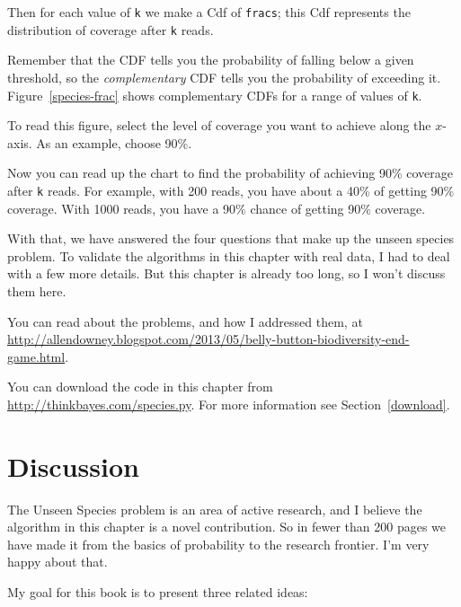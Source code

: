 \documentclass[12pt]{book}
\begin{document}
Then for each value of {\tt k} we make a Cdf of {\tt fracs}; this Cdf
represents the distribution of coverage after {\tt k} reads.

Remember that the CDF tells you the probability of falling below a
given threshold, so the {\em complementary} CDF tells you the
probability of exceeding it.  Figure~\ref{species-frac} shows
complementary CDFs for a range of values of {\tt k}.

To read this figure, select the level of coverage you want to achieve
along the $x$-axis.  As an example, choose 90\%.

Now you can read up the chart to find the probability of achieving
90\% coverage after {\tt k} reads.  For example, with 200 reads,
you have about a 40\% of getting 90\% coverage.  With 1000 reads, you
have a 90\% chance of getting 90\% coverage.

With that, we have answered the four questions that make up the unseen
species problem.  To validate the algorithms in this chapter with
real data, I had to deal with a few more details.  But
this chapter is already too long, so I won't discuss them here.

You can read about the problems, and how I addressed them, at
\url{http://allendowney.blogspot.com/2013/05/belly-button-biodiversity-end-game.html}.

You can download the code in this chapter from
\url{http://thinkbayes.com/species.py}.
  For more information
see Section~\ref{download}.


\section{Discussion}

The Unseen Species problem is an area of active research, and I
believe the algorithm in this chapter is a novel contribution.  So in
fewer than 200 pages we have made it from the basics of probability to
the research frontier.  I'm very happy about that.

My goal for this book is to present three related ideas:
\end{document}
